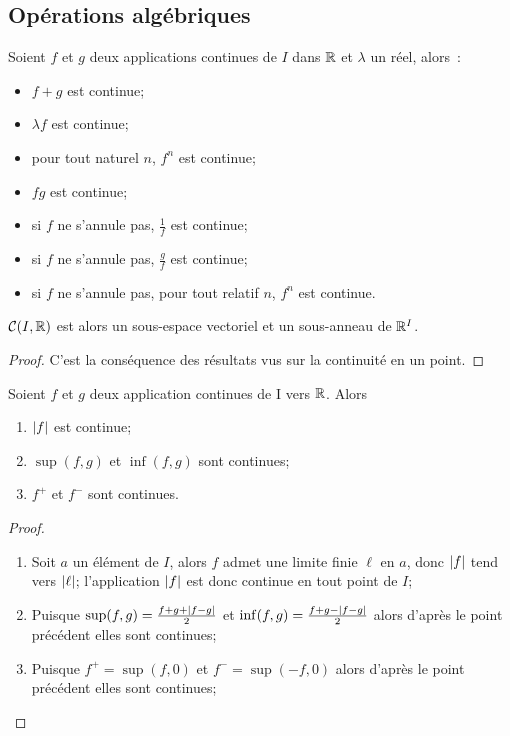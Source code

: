 \subsection{Opérations algébriques}

\begin{prop}
  Soient \(f\) et \(g\) deux applications continues de \(I\) dans \(\mathbb{R}\) et
  \(\lambda\) un réel, alors~:
  \begin{itemize}
    \item \(f+g\) est continue;
    \item \(\lambda f\) est continue;
    \item pour tout naturel \(n\), \(f^n\) est continue;
    \item \(fg\) est continue;
    \item si \(f\) ne s'annule pas, \(\frac{1}{f}\) est continue;
    \item si \(f\) ne s'annule pas, \(\frac{g}{f}\) est continue;
    \item si \(f\) ne s'annule pas, pour tout relatif \(n\), \(f^n\) est
      continue.
  \end{itemize}
  \(\mathcal{C}(I,\mathbb{R})\) est alors un sous-espace vectoriel et un sous-anneau de
  \(\mathbb{R}^I\).
\end{prop}
\begin{proof}
  C'est la conséquence des résultats vus sur la continuité en un point.
\end{proof}
\begin{prop}
  Soient \(f\) et \(g\) deux application continues de I vers \(\mathbb{R}\). Alors
  \begin{enumerate}
    \item \(\left\lvert f\right\rvert\) est continue;
    \item \(\sup(f,g)\) et \(\inf(f,g)\) sont continues;
    \item \(f^{+}\) et \(f^{-}\) sont continues.
  \end{enumerate}
\end{prop}
\begin{proof}
  \begin{enumerate}
    \item Soit \(a\) un élément de \(I\), alors \(f\) admet une limite finie
      \(\ell\) en \(a\), donc \(\left\lvert f\right\rvert\) tend vers \(\left\lvert\ell\right\rvert\);
      l'application \(\left\lvert f\right\rvert\) est donc continue en tout point de \(I\);
    \item Puisque \(\sup(f,g)=\frac{f+g+\left\lvert f-g\right\rvert}{2}\) et
      \(\inf(f,g)=\frac{f+g-\left\lvert f-g\right\rvert}{2}\) alors d'après le point précédent
      elles sont continues;
    \item Puisque \(f^{+}=\sup(f,0)\) et \(f^{-}=\sup(-f,0)\) alors d'après le
      point précédent elles sont continues;
  \end{enumerate}
\end{proof}
